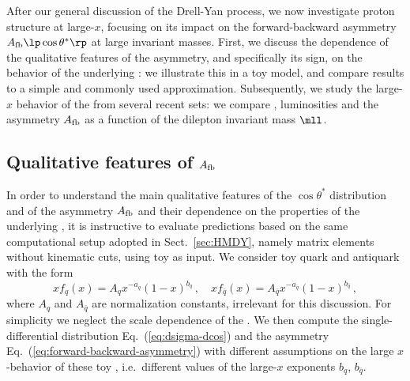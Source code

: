
After our general discussion of the Drell-Yan process,
we now investigate
 proton structure at large-$x$, focusing on its
impact on the forward-backward asymmetry $A_{\rm fb}\lp \cos\theta^*\rp$
at large invariant masses.
%
First, we discuss the dependence of the
qualitative features of the asymmetry,
and specifically its sign, on the behavior of the underlying \pdfs: we
illustrate this in a toy model, and compare results to a simple and 
commonly used approximation.
%
Subsequently,
we study the large-$x$ behavior of the \pdfs from several
recent \pdf sets: we compare \pdfs, luminosities and the \lo asymmetry
$A_{\rm fb}$ as a function of the dilepton invariant mass $\mll$.

\subsection{Qualitative features of \texorpdfstring{$A_{\rm fb}$}{Afb}}
\label{sec:afb_toy}

In order to understand the main qualitative features of  the $\cos\theta^*$
distribution and of the asymmetry $A_{\rm fb}$ and their dependence on the 
properties of the underlying
\pdfs, it is instructive to evaluate predictions based on the
same computational setup adopted in Sect.~\ref{sec:HMDY}, namely
 \lo matrix elements without kinematic cuts, using toy \pdfs as input.
%
We consider toy quark and antiquark \pdf with  the form
\begin{equation}
  \label{eq:toypdf}
  xf_q(x) = A_qx^{-a_q}(1-x)^{b_q} \, , \quad xf_{\bar{q}}(x) = A_{\bar{q}}x^{-a_{\bar{q}}}(1-x)^{b_{\bar{q}}} \, ,
\end{equation}
where $A_q$ and $A_{\bar{q}}$ are  normalization constants, irrelevant
for this discussion.
%
For simplicity we neglect the scale dependence of
the \pdfs.
%
We then compute the single-differential distribution Eq.~(\ref{eq:dsigma-dcos}) and
the asymmetry Eq.~(\ref{eq:forward-backward-asymmetry}) with different assumptions on the
large $x$-behavior of these toy \pdfs, i.e.\ different values of the large-$x$
exponents $b_q$, $b_{\bar{q}}$.


